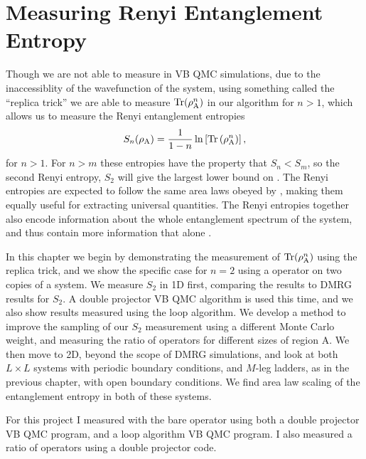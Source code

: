 \chapter{Measuring Renyi Entanglement Entropy}

Though we are not able to measure \vn in VB QMC simulations, due to the inaccessiblity of the wavefunction of the system, using something called the ``replica trick'' \cite{dad} we are able to measure ${\rm Tr}(\rho_{\rm A}^n)$ in our algorithm for $n>1$, which allows us to measure the Renyi entanglement entropies 
\begin{equation} \label{renyi2}
 	S_n(\rho_{\rm A}) = \frac{1}{1-n}\ln\left[{\rm Tr}\left( \rho_{\rm A}^n \right) \right],
\end{equation}
for $n>1$.  For $n>m$ these entropies have the property that $S_n<S_m$, so the second Renyi entropy, $S_2$ will give the largest lower bound on \vn.
The Renyi entropies are expected to follow the same area laws obeyed by \vn \cite{Bbob}, making them equally useful for extracting universal quantities.
The Renyi entropies together also encode information about the whole entanglement spectrum of the system, and thus contain more information that \vn alone \cite{Bbob}.

In this chapter we begin by demonstrating the measurement of ${\rm Tr}(\rho_{\rm A}^n)$ using the replica trick, and we show the specific case for $n=2$ using a \sw operator on two copies of a system.
We measure $S_2$ in 1D first, comparing the results to DMRG results for $S_2$.  
A double projector VB QMC algorithm is used this time, and we also show results measured using the loop algorithm.
We develop a method to improve the sampling of our $S_2$ measurement using a different Monte Carlo weight, and measuring the ratio of \swa operators for different sizes of region A.
We then move to 2D, beyond the scope of DMRG simulations, and look at both $L\times L$ systems with periodic boundary conditions, and $M$-leg ladders, as in the previous chapter, with open boundary conditions.  
We find area law scaling of the entanglement entropy in both of these systems. \cite{PRL2}

For this project I measured \re with the bare \swa operator using both a double projector VB QMC program, and a loop algorithm VB QMC program.  I also measured a ratio of \swa operators using a double projector code.


